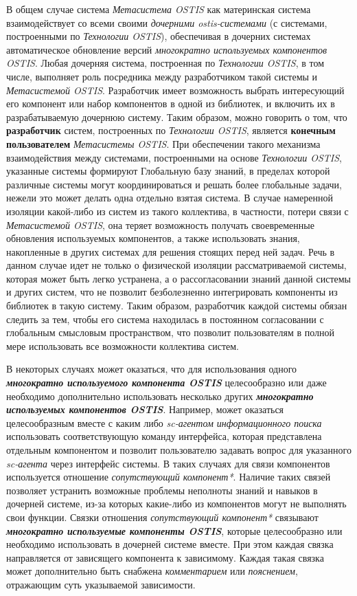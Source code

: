 \begin{SCn}
{В общем случае система \textit{Метасистема OSTIS} как материнская система взаимодействует со всеми своими \textit{дочерними ostis-системами} (с системами, построенными по \textit{Технологии OSTIS}), обеспечивая в дочерних системах автоматическое обновление версий \textit{многократно используемых компонентов OSTIS}. Любая дочерняя система, построенная по \textit{Технологии OSTIS}, в том числе, выполняет роль посредника между разработчиком такой системы и \textit{Метасистемой OSTIS}. Разработчик имеет возможность выбрать интересующий его компонент или набор компонентов в одной из библиотек, и включить их в разрабатываемую дочернюю систему. Таким образом, можно говорить о том, что \textbf{разработчик} систем, построенных по \textit{Технологии OSTIS}, является \textbf{конечным пользователем} \textit{Метасистемы OSTIS}. При обеспечении такого механизма взаимодействия между системами, построенными на основе \textit{Технологии OSTIS}, указанные системы формируют Глобальную базу знаний, в пределах которой различные системы могут координироваться и решать более глобальные задачи, нежели это может делать одна отдельно взятая система. В случае намеренной изоляции какой-либо из систем из такого коллектива, в частности, потери связи с \textit{Метасистемой OSTIS}, она теряет возможность получать своевременные обновления используемых компонентов, а также использовать знания, накопленные в других системах для решения стоящих перед ней задач. Речь в данном случае идет не только о физической изоляции рассматриваемой системы, которая может быть легко устранена, а о рассогласовании знаний данной системы и других систем, что не позволит безболезненно интегрировать компоненты из библиотек в такую систему. Таким образом, разработчик каждой системы обязан следить за тем, чтобы его система находилась в постоянном согласовании с глобальным смысловым пространством, что позволит пользователям в полной мере использовать все возможности коллектива систем.

В некоторых случаях может оказаться, что для использования одного \textbf{\textit{многократно используемого компонента OSTIS}} целесообразно или даже необходимо дополнительно использовать несколько других \textbf{\textit{многократно используемых компонентов OSTIS}}. Например, может оказаться целесообразным вместе с каким либо \textit{sc-агентом информационного поиска} использовать соответствующую команду интерфейса, которая представлена отдельным компонентом и позволит пользователю задавать вопрос для указанного \textit{sc-агента} через интерфейс системы. В таких случаях для связи компонентов используется отношение \textit{сопутствующий компонент*}. Наличие таких связей позволяет устранить возможные проблемы неполноты знаний и навыков в дочерней системе, из-за которых какие-либо из компонентов могут не выполнять свои функции. Связки отношения \textit{сопутствующий компонент*} связывают \textbf{\textit{многократно используемые компоненты OSTIS}}, которые целесообразно или необходимо использовать в дочерней системе вместе. При этом каждая связка направляется от зависящего компонента к зависимому. Каждая такая связка может дополнительно быть снабжена \textit{комментарием} или \textit{пояснением}, отражающим суть указываемой зависимости.

}
\end{SCn}
